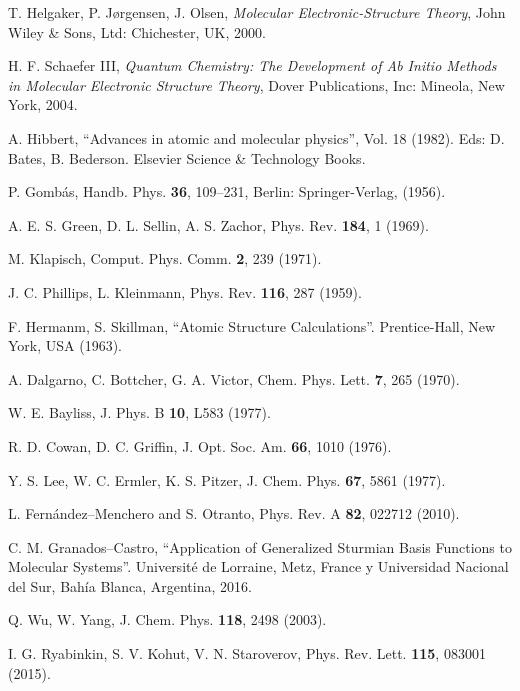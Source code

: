 \begin{thebibliography}{9}
T. Helgaker, P. J{\o}rgensen, J. Olsen,
\textit{Molecular Electronic-Structure Theory},
John Wiley {\&} Sons, Ltd: Chichester, UK, 2000.

H. F. Schaefer III,
\textit{Quantum Chemistry: The Development of Ab Initio Methods in
Molecular Electronic Structure Theory},
Dover Publications, Inc: Mineola, New York, 2004.


A. Hibbert,
``Advances in atomic and molecular physics'', Vol. 18 (1982).
Eds: D. Bates, B. Bederson. Elsevier Science \& Technology Books.

P. Gombás, 
Handb. Phys. \textbf{36}, 109--231, Berlin: Springer-Verlag, (1956).

A. E. S. Green, D. L. Sellin, A. S. Zachor,
Phys. Rev. \textbf{184}, 1 (1969).

M. Klapisch,
Comput. Phys. Comm. \textbf{2}, 239 (1971).

J. C. Phillips, L. Kleinmann,
Phys. Rev. \textbf{116}, 287 (1959).

F. Hermanm, S. Skillman,
``Atomic Structure Calculations''. 
Prentice-Hall, New York, USA (1963).

A. Dalgarno, C. Bottcher, G. A. Victor, 
Chem. Phys. Lett. \textbf{7}, 265 (1970).

W. E. Bayliss,
J. Phys. B \textbf{10}, L583 (1977).

R. D. Cowan, D. C. Griffin, 
J. Opt. Soc. Am. \textbf{66}, 1010 (1976).

Y. S. Lee, W. C. Ermler, K. S. Pitzer, 
J. Chem. Phys. \textbf{67}, 5861 (1977).

L. Fernández--Menchero and S. Otranto, 
Phys. Rev. A {\bf 82}, 022712 (2010).

C. M. Granados--Castro, 
``Application of Generalized Sturmian Basis Functions to
Molecular Systems''. 
Universit\'e de Lorraine, Metz, France y Universidad Nacional del Sur, Bah\'ia Blanca, Argentina, 2016.


Q. Wu, W. Yang,
J. Chem. Phys. \textbf{118}, 2498 (2003).

I. G. Ryabinkin, S. V. Kohut, V. N. Staroverov,
Phys. Rev. Lett. \textbf{115}, 083001 (2015).


\end{thebibliography}
